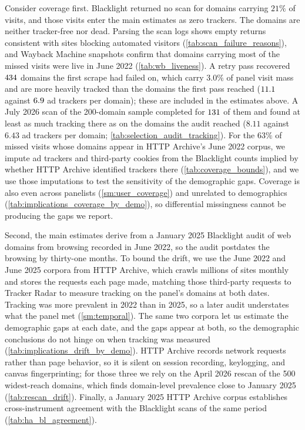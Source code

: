 \documentclass[12pt, letterpaper]{article}
\begin{document}
Consider coverage first. Blacklight returned no scan for domains carrying $21\%$ of visits, and those visits enter the main estimates as zero trackers. The domains are neither tracker-free nor dead. Parsing the scan logs shows empty returns consistent with sites blocking automated visitors (\cref{tab:scan_failure_reasons}), and Wayback Machine snapshots confirm that domains carrying most of the missed visits were live in June 2022 (\cref{tab:wb_liveness}). A retry pass recovered $434$ domains the first scrape had failed on, which carry $3.0\%$ of panel visit mass and are more heavily tracked than the domains the first pass reached ($11.1$ against $6.9$ ad trackers per domain); these are included in the estimates above. A July 2026 scan of the 200-domain sample completed for $131$ of them and found at least as much tracking there as on the domains the audit reached ($8.11$ against $6.43$ ad trackers per domain; \cref{tab:selection_audit_tracking}). For the $63\%$ of missed visits whose domains appear in HTTP Archive's June 2022 corpus, we impute ad trackers and third-party cookies from the Blacklight counts implied by whether HTTP Archive identified trackers there (\cref{tab:coverage_bounds}), and we use those imputations to test the sensitivity of the demographic gaps. Coverage is also even across panelists (\cref{sm:user_coverage}) and unrelated to demographics (\cref{tab:implications_coverage_by_demo}), so differential missingness cannot be producing the gaps we report.

Second, the main estimates derive from a January 2025 Blacklight audit of web domains from browsing recorded in June 2022, so the audit postdates the browsing by thirty-one months. To bound the drift, we use the June 2022 and June 2025 corpora from HTTP Archive, which crawls millions of sites monthly and stores the requests each page made, matching those third-party requests to Tracker Radar to measure tracking on the panel's domains at both dates. Tracking was more prevalent in 2022 than in 2025, so a later audit understates what the panel met (\cref{sm:temporal}).
The same two corpora let us estimate the demographic gaps at each date, and the gaps appear at both, so the demographic conclusions do not hinge on when tracking was measured (\cref{tab:implications_drift_by_demo}). HTTP Archive records network requests rather than page behavior, so it is silent on session recording, keylogging, and canvas fingerprinting; for those three we rely on the April 2026 rescan of the 500 widest-reach domains, which finds domain-level prevalence close to January 2025 (\cref{tab:rescan_drift}). Finally, a January 2025 HTTP Archive corpus establishes cross-instrument agreement with the Blacklight scans of the same period (\cref{tab:ha_bl_agreement}).
\end{document}
